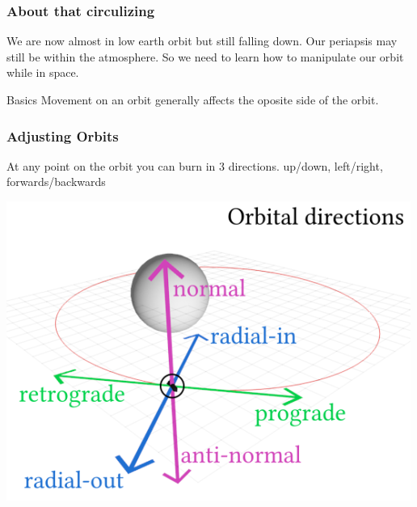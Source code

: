 {
%
\begin{frame}
\end{frame}
\begin{frame}
    \frametitle{About that circulizing}
    \begin{block}{}
        We are now almost in low earth orbit but still falling down. Our periapsis may still be within the atmosphere.
        So we need to learn how to manipulate our orbit while in space.
    \end{block}
    \begin{block}{Basics}
        Movement on an orbit generally affects the oposite side of the orbit.
    \end{block}
\end{frame}
\begin{frame}
    \frametitle{Adjusting Orbits}
    \begin{block}{}
        \begin{center}
            At any point on the orbit you can burn in 3 directions. up/down, left/right, forwards/backwards
        \end{center}
    \end{block}
    \begin{block}{}
        \begin{center}
            \includegraphics[scale=0.8]{images/maneuver_node}

\end{center}
\end{block}
\end{frame}}
